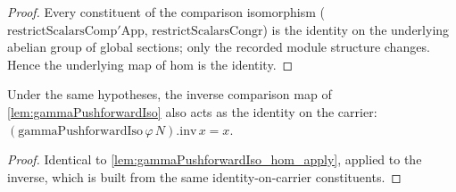 \begin{proof}
  Every constituent of the comparison isomorphism
  (\(\mathrm{restrictScalarsComp'App}\), \(\mathrm{restrictScalarsCongr}\)) is the identity
  on the underlying abelian group of global sections; only the recorded module structure
  changes. Hence the underlying map of \(\mathrm{hom}\) is the identity.
\end{proof}

\begin{lemma}



  \label{lem:gammaPushforwardIso_inv_apply}
  Under the same hypotheses, the inverse comparison map of \cref{lem:gammaPushforwardIso}
  also acts as the identity on the carrier: \((\mathrm{gammaPushforwardIso}\,\varphi\,N).\mathrm{inv}\,x = x\).
\end{lemma}

\begin{proof}
  Identical to \cref{lem:gammaPushforwardIso_hom_apply}, applied to the inverse, which is
  built from the same identity-on-carrier constituents.
\end{proof}

